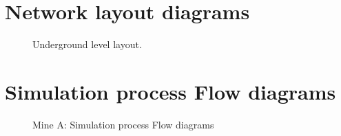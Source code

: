 \begin{appendices}
	\renewcommand{\thechapter}{\Roman{chapter}}
\chapter{Network layout diagrams}
	\clearpage
	
\begin{figure}[h]
	\centering
	\caption{Underground level layout.}
	\label{fig: KUS Underground level layout}
\end{figure}	

\chapter{Simulation process Flow diagrams}\label{Schematics}
\clearpage
	
	\begin{figure}[h!]
		\centering
		\caption{Mine A: Simulation process Flow diagrams}
		\label{fig: BEET Baseline model}
	\end{figure}


\end{appendices}
